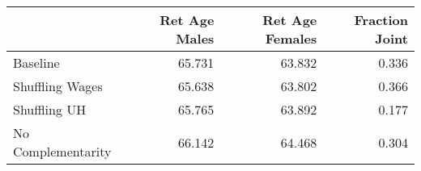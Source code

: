 \begin{tabular}{lrrr}
\toprule
{} & Ret Age Males & Ret Age Females & Fraction Joint \\
\midrule
Baseline           &        65.731 &          63.832 &          0.336 \\
Shuffling Wages    &        65.638 &          63.802 &          0.366 \\
Shuffling UH       &        65.765 &          63.892 &          0.177 \\
No Complementarity &        66.142 &          64.468 &          0.304 \\
\bottomrule
\end{tabular}
